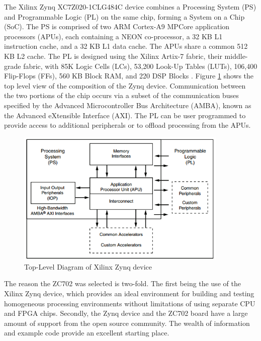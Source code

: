 The Xilinx Zynq XC7Z020-1CLG484C device combines a Processing System (PS) and Programmable Logic (PL) on the same chip, forming a System on a Chip (SoC).  The PS is comprised of two ARM Cortex-A9 MPCore application processors (APUs), each containing a NEON co-processor, a 32 KB L1 instruction cache, and a 32 KB L1 data cache.  The APUs share a common 512 KB L2 cache.  The PL is designed using the Xilinx Artix-7 fabric, their middle-grade fabric, with 85K Logic Cells (LCs), 53,200 Look-Up Tables (LUTs), 106,400 Flip-Flops (FFs), 560 KB Block RAM, and 220 DSP Blocks \cite{xilinx_zynq}. Figure \ref{fig:zynq_top_level} shows the top level view of the composition of the Zynq device.  Communication between the two portions of the chip occurs via a subset of the communication buses specified by the Advanced Microcontroller Bus Architecture (AMBA), known as the Advanced eXtensible Interface (AXI).  The PL can be user programmed to provide access to additional peripherals or to offload processing from the APUs.

\begin{figure}[!h]
  \centering
  \includegraphics[width=0.9\textwidth]{./img/zynq_top_level.PNG}
  \caption{Top-Level Diagram of Xilinx Zynq device}
  \label{fig:zynq_top_level}
\end{figure}

The reason the ZC702 was selected is two-fold.  The first being the use of the Xilinx Zynq device, which provides an ideal environment for building and testing homogeneous processing environments without limitations of using separate CPU and FPGA chips.  Secondly, the Zynq device and the ZC702 board have a large amount of support from the open source community.  The wealth of information and example code provide an excellent starting place.

